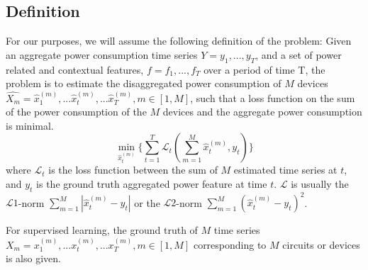\subsection{Definition}
For our purposes, we will assume the following definition of the problem:
Given an aggregate power consumption time series $Y=y_1, ..., y_T$, and a set of
power related and contextual features, $f=f_1, ..., f_T$ over a period of time T, 
the problem is to estimate the disaggregated power consumption of $M$ devices 
$\hat{X_m }= \hat{x}_{1}^{(m)}, ...\hat{x}_{t}^{(m)}, ... \hat{x}_{T}^{(m)}, m\in[1, M]$, 
such that a loss function on the sum of the power consumption of the $M$
devices and the aggregate power consumption is minimal. 
\begin{equation}
\label{eq_powerObj}
\min_{\hat{x}_{t}^{(m)}} \{ \sum_{t=1}^T \mathscr{L}_t(\sum_{m=1}^M \hat{x}_{t}^{(m)}, y_t) \}
\end{equation}
where $\mathscr{L}_t$ is the loss function between 
the sum of $M$ estimated time series at $t$, 
and $y_t$ is the ground truth aggregated power feature at time $t$. 
$\mathscr{L}$ is usually the $\mathscr{L}1$-norm $\sum_{m=1}^M |\hat{x}_{t}^{(m)} - y_t|$
or the $\mathscr{L}2$-norm $\sum_{m=1}^M (\hat{x}_{t}^{(m)}-y_t)^2$.

For supervised learning, 
the ground truth of $M$ time series 
$X_m = x_{1}^{(m)}, ...x_{t}^{(m)}, ... x_{T}^{(m)}, m\in[1, M]$ 
corresponding to $M$ circuits or devices is also given.



